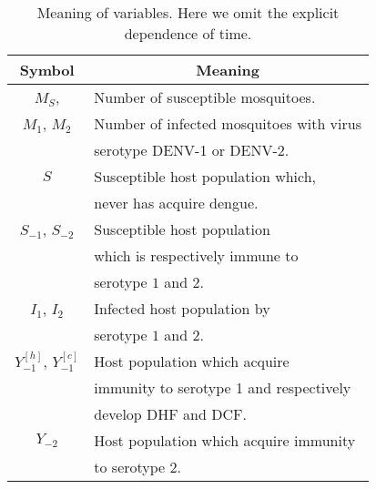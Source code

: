 
\begin{table*}[htb]
	\begin{center}
		\begin{tabular}{cl}
			\toprule
			Symbol		&	\multicolumn{1}{c}{Meaning}
			\\
			\midrule
			$M_S$,
				& Number of susceptible mosquitoes.
			\\
			$M_1$, $M_2$
				&
				 Number of infected mosquitoes with virus
				\\
				& 
				serotype \ac{DENV-1} or \ac{DENV-2}.
			\\
			$S$
				&
				Susceptible host population which, 
				\\
				& never has acquire dengue.
			\\
			$S_{-1}$, $S_{-2}$
			&
				Susceptible host population 
			\\
			& which is respectively immune to
			\\
			&
				serotype $1$ and $2$.
			\\
			$I_1$, $I_2$
			&
				Infected host population by 
			\\
				& serotype $1$ and $2$.
			\\
				$Y_{-1}^{[h]}$,
				$Y_{-1}^{[c]}$
				&
				Host population which acquire
				\\
				&
				immunity to serotype 1 and respectively 
				\\
				&
				develop \ac{DHF} and \ac{DCF}.
			\\
				$Y_{-2}$
				&
				Host population which acquire immunity
				\\
				&
				to serotype 2.
			\\
		\bottomrule
		\end{tabular}
	\end{center}
	\caption{
		Meaning of variables. 
		Here we omit the explicit dependence of
		time.
	}
\end{table*}
